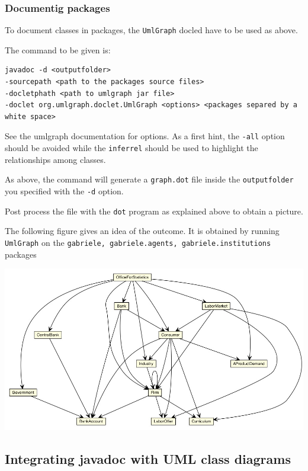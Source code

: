 \documentclass{book}
\begin{document}
\subsubsection{Documentig packages}

To document classes in packages, the \verb+UmlGraph+ docled have to be used as above.

The command to be given is:

\begin{verbatim}
javadoc -d <outputfolder>
-sourcepath <path to the packages source files>
-docletphath <path to umlgraph jar file>
-doclet org.umlgraph.doclet.UmlGraph <options> <packages separed by a white space>
\end{verbatim}

See the umlgraph documentation for options. As a first hint, the \verb+-all+ option should be avoided while the \verb+inferrel+ should be used to highlight the relationships among classes. 

As above, the command will generate a \verb+graph.dot+ file inside the \verb+outputfolder+ you specified with the \verb+-d+ option.

Post process the file with the \verb+dot+ program as explained above to obtain a picture.

The following figure gives an idea of the outcome. It is obtained by running \verb+UmlGraph+ on the \verb+gabriele, gabriele.agents, gabriele.institutions+ packages


\hskip-2cm\includegraphics[scale=0.5]{../umlgraph/packages_classes.jpg}



\subsection{Integrating javadoc with UML class diagrams}
\end{document}
